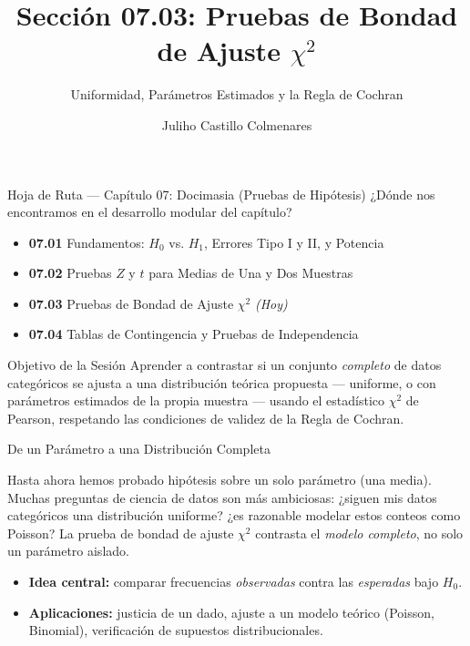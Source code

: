 \documentclass[10pt, aspectratio=169]{beamer}
\title[Bondad de Ajuste $\chi^2$]{Sección 07.03: Pruebas de Bondad de Ajuste $\chi^2$}
\subtitle{Uniformidad, Parámetros Estimados y la Regla de Cochran}
\author[J. Castillo Colmenares]{Juliho Castillo Colmenares}
\institute{Tecnológico de Monterrey}
\date{\vspace{-1.2cm}}
\begin{document}
\begin{frame}[plain]
  \vspace{-0.8cm}
  \titlepage
\end{frame}

\begin{frame}{Hoja de Ruta --- Capítulo 07: Docimasia (Pruebas de Hipótesis)}
  \footnotesize
  ¿Dónde nos encontramos en el desarrollo modular del capítulo? \pause
  \begin{itemize}\itemsep=0.08em
    \item \textbf{07.01} Fundamentos: $H_0$ vs. $H_1$, Errores Tipo I y II, y Potencia \pause
    \item \textbf{07.02} Pruebas $Z$ y $t$ para Medias de Una y Dos Muestras \pause
    \item \textbf{07.03} Pruebas de Bondad de Ajuste $\chi^2$ \emph{(Hoy)} \pause
    \item \textbf{07.04} Tablas de Contingencia y Pruebas de Independencia
  \end{itemize}
  \vspace{-0.05cm}
  \begin{block}{Objetivo de la Sesión}
    Aprender a contrastar si un conjunto \emph{completo} de datos categóricos se ajusta a una distribución teórica propuesta --- uniforme, o con parámetros estimados de la propia muestra --- usando el estadístico $\chi^2$ de Pearson, respetando las condiciones de validez de la Regla de Cochran.
  \end{block}
\end{frame}

\begin{frame}{De un Parámetro a una Distribución Completa}
  \footnotesize
  \begin{motivacion}
    Hasta ahora hemos probado hipótesis sobre un solo parámetro (una media). Muchas preguntas de ciencia de datos son más ambiciosas: ¿siguen mis datos categóricos una distribución uniforme? ¿es razonable modelar estos conteos como Poisson? La prueba de bondad de ajuste $\chi^2$ contrasta el \emph{modelo completo}, no solo un parámetro aislado.
  \end{motivacion}

  \vspace{0.15cm}
  \pause
  \begin{itemize}\itemsep=0.1cm
    \item \textbf{Idea central:} comparar frecuencias \emph{observadas} contra las \emph{esperadas} bajo $H_0$. \pause
    \item \textbf{Aplicaciones:} justicia de un dado, ajuste a un modelo teórico (Poisson, Binomial), verificación de supuestos distribucionales.
  \end{itemize}
\end{frame}
\end{document}
